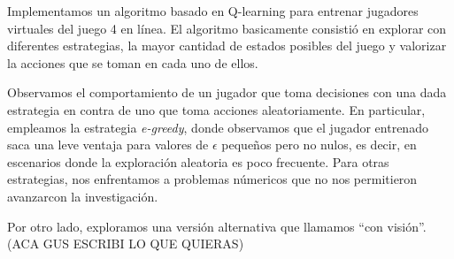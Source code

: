 \documentclass[11pt, spanish]{article}
\begin{document}
\par Implementamos un algoritmo basado en Q-learning para entrenar jugadores virtuales del juego 4 en línea. El algoritmo basicamente consistió en explorar con diferentes estrategias, la mayor cantidad de estados posibles del juego y valorizar la acciones que se toman en cada uno de ellos.
\par Observamos el comportamiento de un jugador que toma decisiones con una dada estrategia en contra de uno que toma acciones aleatoriamente. En particular, empleamos la estrategia \emph{e-greedy}, donde observamos que el jugador entrenado saca una leve ventaja para valores de $\epsilon$ pequeños pero no nulos, es decir, en escenarios donde la exploración aleatoria es poco frecuente. Para otras estrategias, nos enfrentamos a problemas númericos que no nos permitieron avanzarcon la investigación.
\par Por otro lado, exploramos una versión alternativa que llamamos ``con visión''. (ACA GUS ESCRIBI LO QUE QUIERAS)
\end{document}
